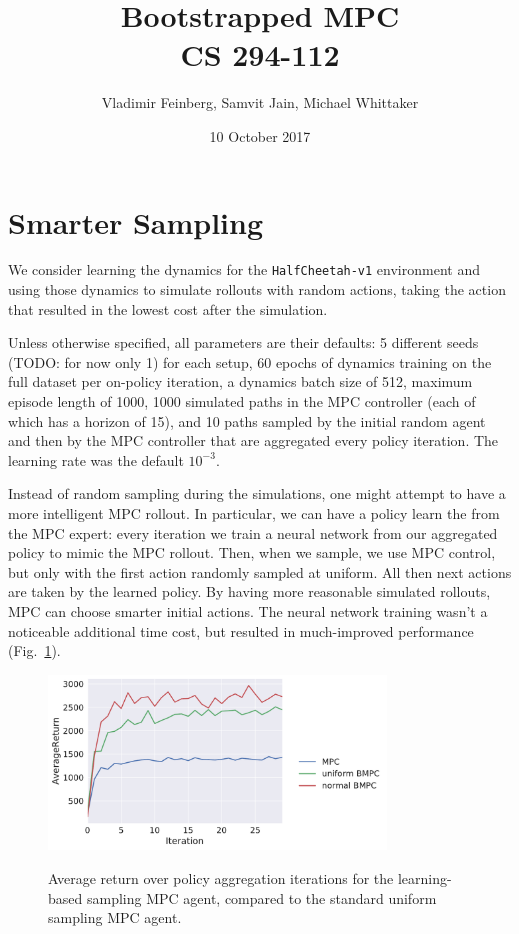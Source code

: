 \documentclass{article}
\title{Bootstrapped MPC\\\large CS 294-112}
\author{Vladimir Feinberg, Samvit Jain, Michael Whittaker}
\date{10 October 2017}
\begin{document}
	
\maketitle

\section{Smarter Sampling}\label{smart-sample}

We consider learning the dynamics for the \texttt{HalfCheetah-v1} environment and using those dynamics to simulate rollouts with random actions, taking the action that resulted in the lowest cost after the simulation.

Unless otherwise specified, all parameters are their defaults: 5 different seeds (TODO: for now only 1) for each setup, 60 epochs of dynamics training on the full dataset per on-policy iteration, a dynamics batch size of 512, maximum episode length of 1000, 1000 simulated paths in the MPC controller (each of which has a horizon of 15), and 10 paths sampled by the initial random agent and then by the MPC controller that are aggregated every policy iteration. The learning rate was the default $10^{-3}$.

Instead of random sampling during the simulations, one might attempt to have a more intelligent MPC rollout. In particular, we can have a policy learn the from the MPC expert: every iteration we train a neural network from our aggregated policy to mimic the MPC rollout. Then, when we sample, we use MPC control, but only with the first action randomly sampled at uniform. All then next actions are taken by the learned policy. By having more reasonable simulated rollouts, MPC can choose smarter initial actions. The neural network training wasn't a noticeable additional time cost, but resulted in much-improved performance (Fig.~\ref{fig:mpcmf}).

\begin{figure}[!h]
  \begin{center}
    {\includegraphics[width=0.8\textwidth]{easy-AverageReturn.pdf}}
  \end{center}
  \caption{Average return over policy aggregation iterations for the learning-based sampling MPC agent, compared to the standard uniform sampling MPC agent.}
\label{fig:mpcmf}
\end{figure}
\end{document}
